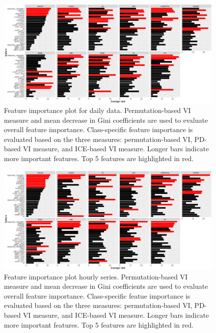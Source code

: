 \documentclass[11pt,a4paper,]{article}
\begin{document}
\begin{figure}[h]

{\centering \includegraphics{figures/vidaily-1} 

}

\caption{Feature importance plot for daily data. Permutation-based VI measure and mean decrease in Gini coefficients are used to evaluate overall feature importance. Class-specific feature importance is evaluated based on the three measures: permutation-based VI, PD-based VI measure, and ICE-based VI measure. Longer bars indicate more important features. Top 5 features are highlighted in red.}\label{fig:vidaily}
\end{figure}

\begin{figure}
\centering
\includegraphics{figures/vihourly-1.png}
\caption{\label{fig:vihourly}Feature importance plot hourly series.
Permutation-based VI measure and mean decrease in Gini coefficients are
used to evaluate overall feature importance. Class-specific featue
importance is evaluated based on the three measures: permutation-based
VI, PD-based VI measure, and ICE-based VI measure. Longer bars indicate
more important features. Top 5 features are highlighted in red.}
\end{figure}
\end{document}
